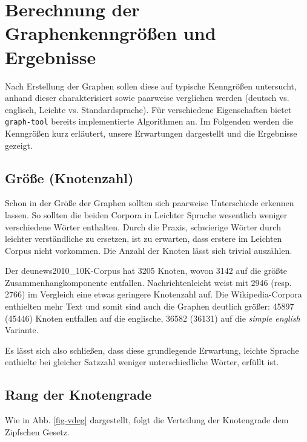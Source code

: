 \documentclass[11pt, a4paper]{article}
\begin{document}
\section{Berechnung der Graphenkenngr\"o\ss{}en und Ergebnisse}
\label{sec:berechnung-ergebnisse}

Nach Erstellung der Graphen sollen diese auf typische Kenngrößen untersucht,
anhand dieser charakterisiert sowie paarweise verglichen werden (deutsch vs.
englisch, Leichte vs. Standardsprache).
Für verschiedene Eigenschaften bietet \texttt{graph-tool} bereits implementierte
Algorithmen an. Im Folgenden werden die Kenngrößen kurz erläutert, unsere
Erwartungen dargestellt und die Ergebnisse gezeigt.


\subsection{Gr\"o\ss{}e (Knotenzahl)}
\label{groesse-knotenzahl}

Schon in der Größe der Graphen sollten sich paarweise Unterschiede erkennen
lassen. So sollten die beiden Corpora in Leichter Sprache wesentlich weniger
verschiedene Wörter enthalten. Durch die Praxis, schwierige Wörter
durch leichter verständliche zu ersetzen, ist zu erwarten, dass erstere im
Leichten Corpus nicht vorkommen. Die Anzahl der Knoten lässt sich trivial
auszählen.

Der deunews2010\_10K-Corpus hat 3205 Knoten, wovon 3142 auf die größte
Zusammenhangkomponente entfallen.
Nachrichtenleicht weist mit 2946 (resp. 2766) im Vergleich eine etwas geringere
Knotenzahl auf.
Die Wikipedia-Corpora enthielten mehr Text und somit sind auch die Graphen
deutlich größer: 45897 (45446) Knoten entfallen auf die englische, 36582 (36131)
auf die \emph{simple english} Variante.

Es l\"asst sich also schlie\ss{}en, dass diese grundlegende Erwartung,
leichte Sprache enthielte bei gleicher Satzzahl weniger unterschiedliche Wörter,
erf\"ullt ist.


\subsection{Rang der Knotengrade}

Wie in Abb. \ref{fig-vdeg} dargestellt, folgt die Verteilung der Knotengrade
dem Zipfschen Gesetz.
\end{document}
